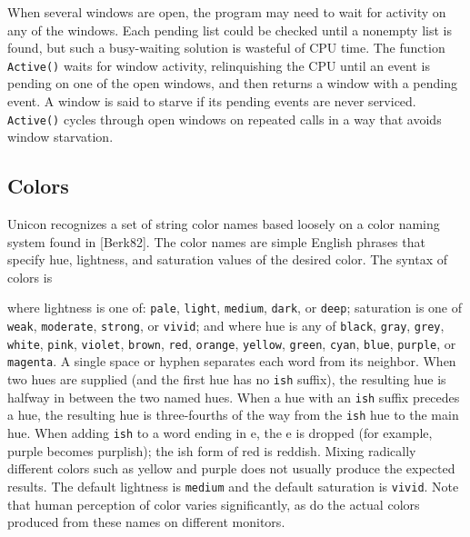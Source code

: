 When several windows are open, the program may need to wait for
activity on any of the windows. Each pending list could be checked
until a nonempty list is found, but such a busy-waiting solution is
wasteful of CPU time. The function \texttt{Active()} waits for window
activity, relinquishing the CPU until an event is pending on one of
the open windows, and then returns a window with a pending event. A
window is said to starve if its pending events are never
serviced. \texttt{Active()} cycles through open windows on repeated
calls in a way that avoids window starvation.

\subsection{Colors}

Unicon recognizes a set of string color names based loosely on a color
naming system found in [Berk82]. The color names are simple English
phrases that specify hue, lightness, and saturation values of the
desired color. The syntax of colors is


\noindent
where lightness is one of: \texttt{pale}, \texttt{light},
\texttt{medium}, \texttt{dark}, or \texttt{deep}; saturation is one of
\texttt{weak}, \texttt{moderate}, \texttt{strong}, or \texttt{vivid};
and where hue is any of \texttt{black}, \texttt{gray}, \texttt{grey},
\texttt{white}, \texttt{pink}, \texttt{violet}, \texttt{brown},
\texttt{red}, \texttt{orange}, \texttt{yellow}, \texttt{green},
\texttt{cyan}, \texttt{blue}, \texttt{purple}, or \texttt{magenta}. A
single space or hyphen separates each word from its neighbor. When two
hues are supplied (and the first hue has no \texttt{ish} suffix), the
resulting hue is halfway in between the two named hues. When a hue
with an \texttt{ish} suffix precedes a hue, the resulting hue is
three-fourths of the way from the \texttt{ish} hue to the main
hue. When adding \texttt{ish} to a word ending in e, the e is dropped
(for example, purple becomes purplish); the ish form of red is
reddish. Mixing radically different colors such as yellow and purple
does not usually produce the expected results. The default lightness
is \texttt{medium} and the default saturation is \texttt{vivid}. Note
that human perception of color varies significantly, as do the actual
colors produced from these names on different monitors.

